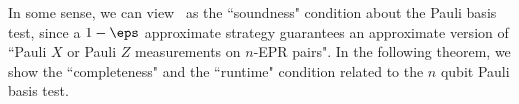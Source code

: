 

In some sense, we can view~ as the ``soundness" condition about the Pauli basis test, since a $1 - \eps$ approximate strategy guarantees an approximate version of ``Pauli $X$ or Pauli $Z$ measurements on $n$-EPR pairs". In the following theorem, we show the ``completeness" and the ``runtime" condition related to the $n$ qubit Pauli basis test. 


